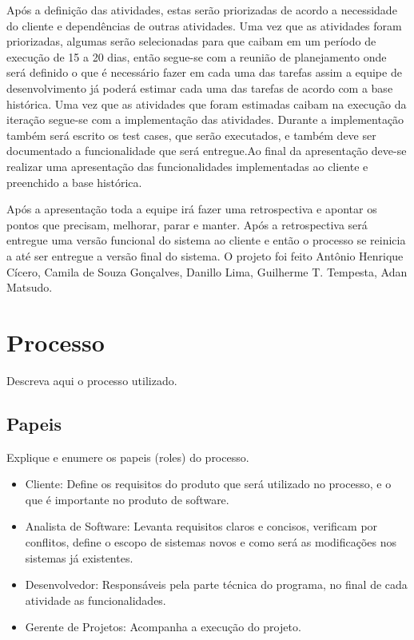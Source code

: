 \documentclass[	DIV=calc,%
							paper=a4,%
							fontsize=12pt,%
							onecolumn]{scrartcl}	 					%
\begin{document}
 Após a definição das atividades, estas serão priorizadas de acordo a necessidade do cliente e dependências de outras atividades. Uma vez que as atividades foram priorizadas, algumas serão selecionadas para que caibam em um período de execução de 15 a 20 dias, então segue-se com a reunião de planejamento onde será definido o que é necessário fazer em cada uma das tarefas assim a equipe de desenvolvimento já poderá estimar cada uma das tarefas de acordo com a base histórica. Uma vez que as atividades que foram estimadas caibam na execução da iteração segue-se com a implementação das atividades. Durante a implementação também será escrito os test cases, que serão executados, e também deve ser documentado a funcionalidade que será entregue.Ao final da apresentação deve-se realizar uma apresentação das funcionalidades implementadas ao cliente e preenchido a base histórica. 
 
 Após a apresentação toda a equipe irá fazer uma retrospectiva e apontar os pontos que precisam, melhorar, parar e manter. Após a retrospectiva será entregue uma versão funcional do sistema ao cliente e então o processo se reinicia a até ser entregue a versão final do sistema. O projeto foi feito Antônio Henrique Cícero, Camila de Souza Gonçalves, Danillo Lima, Guilherme T. Tempesta, Adan Matsudo.
 
\section{Processo}
Descreva aqui o processo utilizado.

\subsection{Papeis}
Explique e enumere os papeis (roles) do processo.

\begin{itemize}
	\item Cliente: Define os requisitos do produto que será utilizado no processo, e o que é importante no produto de software.
	\item Analista de Software: Levanta requisitos claros e concisos, verificam por conflitos, define o  escopo de sistemas novos e como será as modificações nos sistemas já existentes.
	\item Desenvolvedor: Responsáveis pela parte técnica do programa, no final de cada atividade as funcionalidades. 
	\item Gerente de Projetos: Acompanha a execução do projeto. 
\end{itemize}
\end{document}
